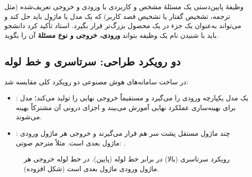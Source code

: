 \begin{definitionbox}{وظیفهٔ پایین‌دستی}
یک مسئلهٔ مشخص و کاربردی با ورودی و خروجی تعریف‌شده (مثل ترجمه، تشخیص گفتار یا تشخیص قصد کاربر) که یک مدل یا ماژول باید حل کند و می‌تواند به‌عنوان یک جزء در یک محصول بزرگ‌تر قرار بگیرد. استاد تأکید کرد دانشجو باید با شنیدن نام یک وظیفه بتواند \textbf{ورودی، خروجی و نوع مسئلهٔ} آن را بگوید.
\end{definitionbox}

\subsection{دو رویکرد طراحی: سرتاسری و خط لوله}
در ساخت سامانه‌های هوش مصنوعی دو رویکرد کلی مقایسه شد:
\begin{itemize}
  \item {}: یک مدل یکپارچه ورودی را می‌گیرد و مستقیماً خروجی نهایی را تولید می‌کند؛ مدل برای بهینه‌سازی عملکرد نهایی آموزش می‌بیند و اجزای درونی آن مشترکاً بهینه می‌شوند.
  \item {}: چند ماژول مستقل پشت سر هم قرار می‌گیرند و خروجی هر ماژول ورودی ماژول بعدی است. مثلاً مترجم صوتی: .
\end{itemize}

\begin{figure}[htbp]
\centering
{}
\caption{رویکرد سرتاسری (بالا) در برابر خط لوله (پایین). در خط لوله خروجی هر ماژول ورودی ماژول بعدی است (شکل افزوده).}
\end{figure}

